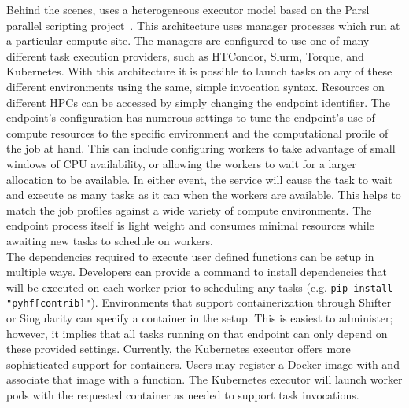 Behind the scenes, \funcX{} uses a heterogeneous executor model based on the Parsl parallel scripting project~\cite{Parsl_paper}.
This architecture uses manager processes which run at a particular compute site.
The managers are configured to use one of many different task execution providers, such as HTCondor, Slurm, Torque, and Kubernetes.
With this architecture it is possible to launch tasks on any of these different environments using the same, simple invocation syntax.
Resources on different HPCs can be accessed by simply changing the endpoint identifier.
The endpoint's configuration has numerous settings to tune the endpoint's use of compute resources to the specific environment and the computational profile of the job at hand.
This can include configuring workers to take advantage of small windows of CPU availability, or allowing the workers to wait for a larger allocation to be available.
In either event, the \funcX{} service will cause the task to wait and execute as many tasks as it can when the workers are available.
This helps to match the job profiles against a wide variety of compute environments.
The endpoint process itself is light weight and consumes minimal resources while awaiting new tasks to schedule on workers.\\

The dependencies required to execute user defined functions can be setup in multiple ways.
Developers can provide a command to install dependencies that will be executed on each worker prior to scheduling any tasks (e.g. \texttt{pip install "pyhf[contrib]"}).
Environments that support containerization through Shifter or Singularity can specify a container in the setup.
This is easiest to administer; however, it implies that all tasks running on that endpoint can only depend on these provided settings.
Currently, the Kubernetes executor offers more sophisticated support for containers.
Users may register a Docker image with \funcX{} and associate that image with a function.
The Kubernetes executor will launch worker pods with the requested container as needed to support task invocations.
